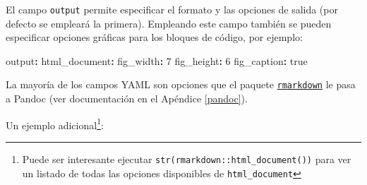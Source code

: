 \documentclass[
]{book}
\newenvironment{Shaded}{\begin{snugshade}}{\end{snugshade}}
\newcommand{\AttributeTok}[1]{\textcolor[rgb]{0.77,0.63,0.00}{#1}}
\newcommand{\CharTok}[1]{\textcolor[rgb]{0.31,0.60,0.02}{#1}}
\newcommand{\DecValTok}[1]{\textcolor[rgb]{0.00,0.00,0.81}{#1}}
\newcommand{\FunctionTok}[1]{\textcolor[rgb]{0.00,0.00,0.00}{#1}}
\newcommand{\KeywordTok}[1]{\textcolor[rgb]{0.13,0.29,0.53}{\textbf{#1}}}
\theoremstyle{break}
\theoremstyle{nonumberplain}
\begin{document}
El campo \texttt{output} permite especificar el formato y las opciones de salida (por defecto se empleará la primera). Empleando este campo también se pueden especificar opciones gráficas para los bloques de código, por ejemplo:

\begin{Shaded}
\begin{Highlighting}[]
\FunctionTok{output}\KeywordTok{:}
\AttributeTok{  }\FunctionTok{html\_document}\KeywordTok{:}
\AttributeTok{    }\FunctionTok{fig\_width}\KeywordTok{:}\AttributeTok{ }\DecValTok{7}
\AttributeTok{    }\FunctionTok{fig\_height}\KeywordTok{:}\AttributeTok{ }\DecValTok{6}
\AttributeTok{    }\FunctionTok{fig\_caption}\KeywordTok{:}\AttributeTok{ }\CharTok{true}
\end{Highlighting}
\end{Shaded}

La mayoría de los campos YAML son opciones que el paquete \href{https://github.com/rstudio/rmarkdown}{\texttt{rmarkdown}} le pasa a Pandoc (ver documentación en el Apéndice \ref{pandoc}).

Un ejemplo adicional\footnote{Puede ser interesante ejecutar \texttt{str(rmarkdown::html\_document())} para ver un listado de todas las opciones disponibles de \texttt{html\_document}}:
\end{document}
